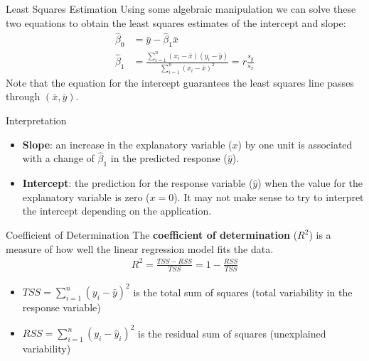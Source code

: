 \documentclass[10pt]{beamer}
\begin{document}
\begin{frame}
\end{frame}

\begin{frame}{Least Squares Estimation}
Using some algebraic manipulation we can solve these two equations to obtain the least squares estimates of the intercept and slope:
\begin{align*}
\hat{\beta}_0 &= \bar{y} - \hat{\beta}_1 \bar{x}\\
\hat{\beta}_1 &= \frac{\sum_{i=1}^n (x_i - \bar{x})(y_i - \bar{y})}{\sum_{i=1}^n (x_i - \bar{x})^2} = r \frac{s_y}{s_x}
\end{align*}
Note that the equation for the intercept guarantees the least squares line passes through $(\bar{x}, \bar{y})$.
\end{frame}

\begin{frame}{Interpretation}
\vspace{-2cm}
\begin{itemize}
\item \textbf{Slope}: an increase in the explanatory variable ($x$) by one unit is associated with a change of $\hat{\beta}_1$ in the predicted response ($\hat{y}$).
\vspace{10pt}
\item \textbf{Intercept}: the prediction for the response variable ($\hat{y}$) when the value for the explanatory variable is zero ($x=0$).  It may not make sense to try to interpret the intercept depending on the application.\\    
\end{itemize}
\end{frame}

\begin{frame}{Coefficient of Determination}
The \textbf{coefficient of determination} ($R^2$) is a measure of how well the linear regression model fits the data.
\begin{align*}
R^2 = \frac{TSS - RSS}{TSS} = 1 - \frac{RSS}{TSS}
\end{align*}
\vspace{10pt}
\begin{itemize}
\item $TSS=\sum_{i=1}^n (y_i - \bar{y})^2$ is the total sum of squares (total variability in the response variable) 
\vspace{5pt}
\item $RSS=\sum_{i=1}^n (y_i - \hat{y}_i)^2$ is the residual sum of squares (unexplained variability)
\end{itemize}
\end{frame}
\end{document}

